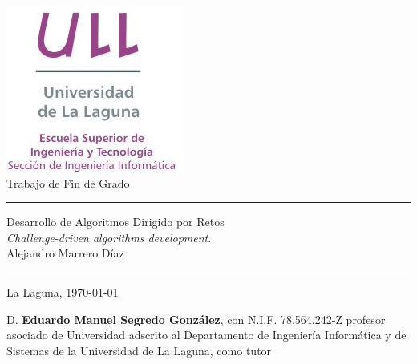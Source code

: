 \documentclass[spanish,a4paper,14pt,oneside]{extreport}
\begin{document}

\pagestyle{empty}
\thispagestyle{empty}


\newcommand{\HRule}{\rule{\linewidth}{1mm}}
\setlength{\parindent}{0mm}
\setlength{\parskip}{0mm}


\begin{center}
\includegraphics[scale=0.8]{images/logo_vertical}\\[10mm]
{\Huge Trabajo de Fin de Grado}
\end{center}

\HRule
\begin{flushright}
        {\Huge Desarrollo de Algoritmos Dirigido por Retos} \\[2.5mm]
        {\Large \textit{Challenge-driven algorithms development}.} \\[5mm]
        {\Large Alejandro Marrero Díaz} \\[5mm]


\end{flushright}
\HRule
{}
\begin{center}
  \Large La Laguna, \today
\end{center}

\setlength{\parindent}{5mm}

\newpage
\thispagestyle{empty}

D. {\bf Eduardo Manuel Segredo González}, con N.I.F. 78.564.242-Z
profesor 
asociado de Universidad
adscrito al Departamento 
de Ingeniería Informática y de Sistemas
de la Universidad de La Laguna, como tutor
\end{document}
